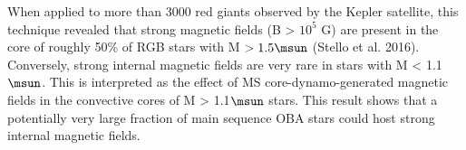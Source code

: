 When applied to more than 3000 red giants observed by the Kepler satellite, this technique revealed that
strong magnetic fields (B > $10^5$ G) are present in the core of roughly 50\% of RGB stars with M $> 1.5\msun$ (Stello et al. 2016).
Conversely, strong internal magnetic fields are very rare in stars with M < 1.1$\msun$. This is interpreted as the
effect of MS core-dynamo-generated magnetic fields in the convective cores of M > 1.1$\msun$ stars.
This result shows that a potentially very large fraction of main sequence OBA stars could host strong internal magnetic fields.




